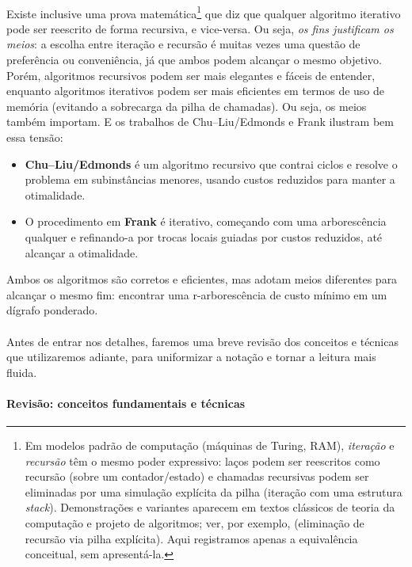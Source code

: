 \documentclass[12pt,a4paper]{article}
\begin{document}
\paragraph{}
Existe inclusive uma prova matemática\footnote{Em modelos padrão de computação (máquinas de Turing, RAM), \emph{iteração} e \emph{recursão} têm o mesmo poder expressivo: laços podem ser reescritos como recursão (sobre um contador/estado) e chamadas recursivas podem ser eliminadas por uma simulação explícita da pilha (iteração com uma estrutura \textit{stack}). Demonstrações e variantes aparecem em textos clássicos de teoria da computação e projeto de algoritmos; ver, por exemplo, \cite{cormen2009} (eliminação de recursão via pilha explícita). Aqui registramos apenas a equivalência conceitual, sem apresentá-la.} que diz que qualquer algoritmo iterativo pode ser reescrito de forma recursiva, e vice-versa. Ou seja, \emph{os fins justificam os meios}: a escolha entre iteração e recursão é muitas vezes uma questão de preferência ou conveniência, já que ambos podem alcançar o mesmo objetivo. Porém, algoritmos recursivos podem ser mais elegantes e fáceis de entender, enquanto algoritmos iterativos podem ser mais eficientes em termos de uso de memória (evitando a sobrecarga da pilha de chamadas). Ou seja, os meios também importam. E os trabalhos de Chu–Liu/Edmonds e Frank ilustram bem essa tensão:
\begin{itemize}\setlength{\itemsep}{2pt}
    \item \textbf{Chu–Liu/Edmonds} é um algoritmo recursivo que contrai ciclos e resolve o problema em subinstâncias menores, usando custos reduzidos para manter a otimalidade.
    \item O procedimento em \textbf{Frank} é iterativo, começando com uma arborescência qualquer e refinando-a por trocas locais guiadas por custos reduzidos, até alcançar a otimalidade.
\end{itemize}
Ambos os algoritmos são corretos e eficientes, mas adotam meios diferentes para alcançar o mesmo fim: encontrar uma r-arborescência de custo mínimo em um dígrafo ponderado.

\paragraph{}
Antes de entrar nos detalhes, faremos uma breve revisão dos conceitos e técnicas que utilizaremos adiante, para uniformizar a notação e tornar a leitura mais fluida.

\paragraph{Revisão: conceitos fundamentais e técnicas}
\end{document}
